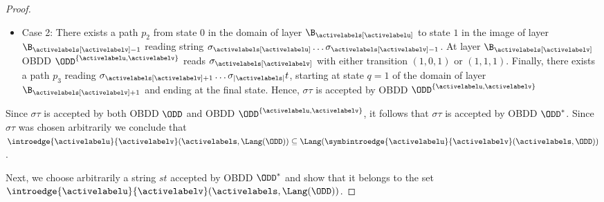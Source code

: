 \begin{proof}
\begin{itemize}
        \item Case 2: There exists a path $p_2$ from state $0$ in the domain of layer $\B_{\activelabels[\activelabelu]}$ to state $1$ in the image of layer $\B_{\activelabels[\activelabelv]-1}$ reading string $\sigma_{\activelabels[\activelabelu]}\dots \sigma_{\activelabels[\activelabelv]-1}$. At layer $\B_{\activelabels[\activelabelv]}$ OBDD $\ODD^{\{\activelabelu,\activelabelv\}}$ reads $\sigma_{\activelabels[\activelabelv]}$ with either transition $(1,0,1)$ or $(1,1,1)$. Finally, there exists a path $p_3$ reading  $\sigma_{\activelabels[\activelabelv] + 1}\dots \sigma_{|\activelabels|}t$, starting at state $q=1$ of the domain of layer $\B_{\activelabels[\activelabelv] + 1}$ and ending at the final state. Hence, $\sigma\tau$ is accepted by OBDD $\ODD^{\{\activelabelu,\activelabelv\}}$
    \end{itemize}

    Since $\sigma\tau$ is accepted by both OBDD $\ODD$ and OBDD $\ODD^{\{\activelabelu,\activelabelv\}}$, it follows that $\sigma\tau$ is accepted by OBDD $\ODD^*$. Since $\sigma\tau$ was chosen arbitrarily we conclude that $\introedge{\activelabelu}{\activelabelv}(\activelabels,\Lang(\ODD)) \subseteq \Lang(\symbintroedge{\activelabelu}{\activelabelv}(\activelabels,\ODD))$.

    Next, we choose arbitrarily a string $st$ accepted by OBDD $\ODD^*$ and show that it belongs to the set $\introedge{\activelabelu}{\activelabelv}(\activelabels,\Lang(\ODD))$.


\end{proof}
